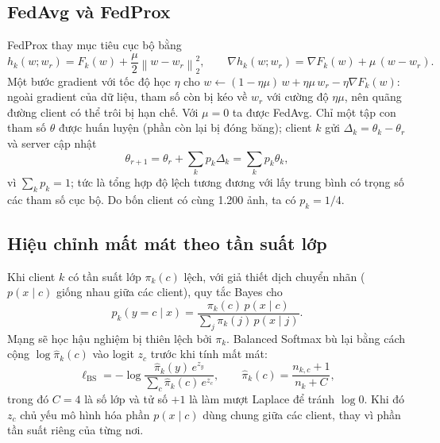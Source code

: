 \documentclass[12pt,a4paper]{report}
\newcommand{\norm}[1]{\left\lVert #1\right\rVert}
\begin{document}
\subsection{FedAvg và FedProx}
FedProx thay mục tiêu cục bộ bằng
\[
h_k(w;w_r)=F_k(w)+\frac{\mu}{2}\norm{w-w_r}_2^2,\qquad
\nabla h_k(w;w_r)=\nabla F_k(w)+\mu\,(w-w_r).
\]
Một bước gradient với tốc độ học $\eta$ cho $w\leftarrow(1-\eta\mu)\,w+\eta\mu\,w_r-\eta\nabla F_k(w)$: ngoài gradient của dữ liệu, tham số còn bị kéo về $w_r$ với cường độ $\eta\mu$, nên quãng đường client có thể trôi bị hạn chế. Với $\mu=0$ ta được FedAvg. Chỉ một tập con tham số $\theta$ được huấn luyện (phần còn lại bị đóng băng); client $k$ gửi $\Delta_k=\theta_k-\theta_r$ và server cập nhật
\[
\theta_{r+1}=\theta_r+\sum_{k}p_k\Delta_k=\sum_k p_k\theta_k,
\]
vì $\sum_kp_k=1$; tức là tổng hợp độ lệch tương đương với lấy trung bình có trọng số các tham số cục bộ. Do bốn client có cùng 1.200 ảnh, ta có $p_k=1/4$.

\subsection{Hiệu chỉnh mất mát theo tần suất lớp}
Khi client $k$ có tần suất lớp $\pi_k(c)$ lệch, với giả thiết dịch chuyển nhãn ($p(x\mid c)$ giống nhau giữa các client), quy tắc Bayes cho
\[
p_k(y=c\mid x)=\frac{\pi_k(c)\,p(x\mid c)}{\sum_{j}\pi_k(j)\,p(x\mid j)}.
\]
Mạng sẽ học hậu nghiệm bị thiên lệch bởi $\pi_k$. Balanced Softmax bù lại bằng cách cộng $\log\hat\pi_k(c)$ vào logit $z_c$ trước khi tính mất mát:
\[
\ell_{\mathrm{BS}}=-\log\frac{\hat\pi_k(y)\,e^{z_y}}{\sum_{c}\hat\pi_k(c)\,e^{z_c}},\qquad
\hat\pi_k(c)=\frac{n_{k,c}+1}{n_k+C},
\]
trong đó $C=4$ là số lớp và tử số $+1$ là làm mượt Laplace để tránh $\log 0$. Khi đó $z_c$ chủ yếu mô hình hóa phần $p(x\mid c)$ dùng chung giữa các client, thay vì phần tần suất riêng của từng nơi.
\end{document}
